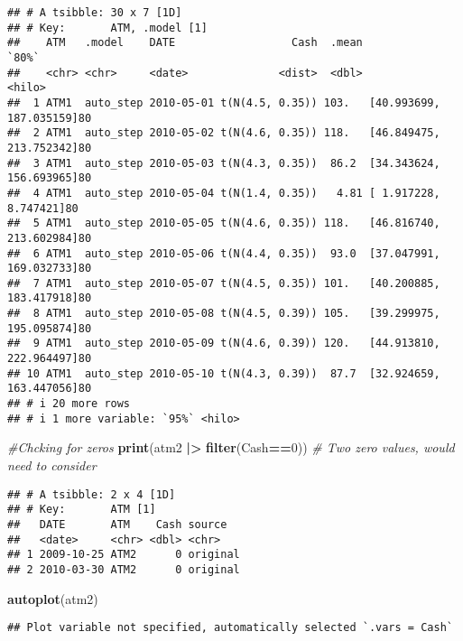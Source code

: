 \documentclass[
]{article}
\newenvironment{Shaded}{\begin{snugshade}}{\end{snugshade}}
\newcommand{\CommentTok}[1]{\textcolor[rgb]{0.56,0.35,0.01}{\textit{#1}}}
\newcommand{\DecValTok}[1]{\textcolor[rgb]{0.00,0.00,0.81}{#1}}
\newcommand{\FunctionTok}[1]{\textcolor[rgb]{0.13,0.29,0.53}{\textbf{#1}}}
\newcommand{\NormalTok}[1]{#1}
\newcommand{\SpecialCharTok}[1]{\textcolor[rgb]{0.81,0.36,0.00}{\textbf{#1}}}
\begin{document}
\begin{verbatim}
## # A tsibble: 30 x 7 [1D]
## # Key:       ATM, .model [1]
##    ATM   .model    DATE                  Cash  .mean                     `80%`
##    <chr> <chr>     <date>              <dist>  <dbl>                    <hilo>
##  1 ATM1  auto_step 2010-05-01 t(N(4.5, 0.35)) 103.   [40.993699, 187.035159]80
##  2 ATM1  auto_step 2010-05-02 t(N(4.6, 0.35)) 118.   [46.849475, 213.752342]80
##  3 ATM1  auto_step 2010-05-03 t(N(4.3, 0.35))  86.2  [34.343624, 156.693965]80
##  4 ATM1  auto_step 2010-05-04 t(N(1.4, 0.35))   4.81 [ 1.917228,   8.747421]80
##  5 ATM1  auto_step 2010-05-05 t(N(4.6, 0.35)) 118.   [46.816740, 213.602984]80
##  6 ATM1  auto_step 2010-05-06 t(N(4.4, 0.35))  93.0  [37.047991, 169.032733]80
##  7 ATM1  auto_step 2010-05-07 t(N(4.5, 0.35)) 101.   [40.200885, 183.417918]80
##  8 ATM1  auto_step 2010-05-08 t(N(4.5, 0.39)) 105.   [39.299975, 195.095874]80
##  9 ATM1  auto_step 2010-05-09 t(N(4.6, 0.39)) 120.   [44.913810, 222.964497]80
## 10 ATM1  auto_step 2010-05-10 t(N(4.3, 0.39))  87.7  [32.924659, 163.447056]80
## # i 20 more rows
## # i 1 more variable: `95%` <hilo>
\end{verbatim}

\begin{Shaded}
\begin{Highlighting}[]
\CommentTok{\#Chcking for zeros}
\FunctionTok{print}\NormalTok{(atm2 }\SpecialCharTok{|\textgreater{}} \FunctionTok{filter}\NormalTok{(Cash}\SpecialCharTok{==}\DecValTok{0}\NormalTok{)) }\CommentTok{\# Two zero values, would need to consider }
\end{Highlighting}
\end{Shaded}

\begin{verbatim}
## # A tsibble: 2 x 4 [1D]
## # Key:       ATM [1]
##   DATE       ATM    Cash source  
##   <date>     <chr> <dbl> <chr>   
## 1 2009-10-25 ATM2      0 original
## 2 2010-03-30 ATM2      0 original
\end{verbatim}

\begin{Shaded}
\begin{Highlighting}[]
\FunctionTok{autoplot}\NormalTok{(atm2)}
\end{Highlighting}
\end{Shaded}

\begin{verbatim}
## Plot variable not specified, automatically selected `.vars = Cash`
\end{verbatim}
\end{document}
